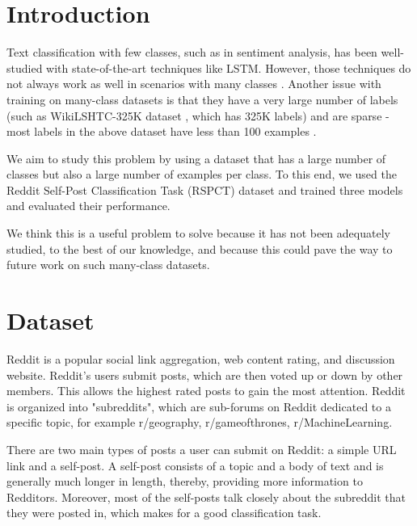 \documentclass{sig-alternate-05-2015}
\begin{document}
%
%
\printccsdesc



\section{Introduction}

Text classification with few classes, such as in sentiment analysis, has been well-studied \cite{sentiment-analysis} with state-of-the-art techniques like LSTM. However, those techniques do not always work as well in scenarios with many classes \cite{many-classes}. Another issue with training on many-class datasets is that they have a very large number of labels (such as WikiLSHTC-325K dataset \cite{partalas2015lshtc}, which has 325K labels) and are sparse - most labels in the above dataset have less than 100 examples \cite{jonesreddit}.

We aim to study this problem by using a dataset that has a large number of classes but also a large number of examples per class. To this end, we used the Reddit Self-Post Classification Task (RSPCT) dataset and trained three models and evaluated their performance.

We think this is a useful problem to solve because it has not been adequately studied, to the best of our knowledge, and because this could pave the way to future work on such many-class datasets.

\section{Dataset}

Reddit is a popular social link aggregation, web content rating, and discussion website. Reddit's users submit posts, which are then voted up or down by other members. This allows the highest rated posts to gain the most attention. Reddit is organized into "subreddits", which are sub-forums on Reddit dedicated to a specific topic, for example r/geography, r/gameofthrones, r/MachineLearning.

There are two main types of posts a user can submit on Reddit: a simple URL link and a self-post. A self-post consists of a topic and a body of text and is generally much longer in length, thereby, providing more information to Redditors. Moreover, most of the self-posts talk closely about the subreddit that they were posted in, which makes for a good classification task.
\end{document}
